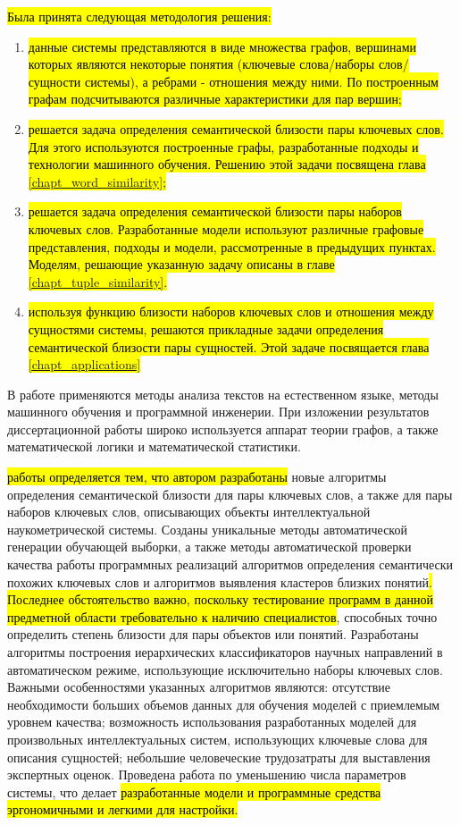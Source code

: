 \hl{Была принята следующая методология решения:}
\begin{enumerate}
    \item \hl{данные системы представляются в виде множества графов, вершинами которых являются некоторые понятия (ключевые слова/наборы слов/сущности системы), а ребрами - отношения между ними. По построенным графам подсчитываются различные характеристики для пар вершин;}
    \item \hl{решается задача определения семантической близости пары ключевых слов. Для этого используются построенные графы, разработанные подходы и технологии машинного обучения. Решению этой задачи посвящена глава {\ref{chapt_word_similarity}};}
    \item \hl{решается задача определения семантической близости пары наборов ключевых слов. Разработанные модели используют различные графовые представления, подходы и модели, рассмотренные в предыдущих пунктах. Моделям, решающие указанную задачу описаны в главе {\ref{chapt_tuple_similarity}}.}
    \item \hl{используя функцию близости наборов ключевых слов и отношения между сущностями системы, решаются прикладные задачи определения семантической близости пары сущностей. Этой задаче посвящается глава {\ref{chapt_applications}}}
\end{enumerate}
В работе применяются методы анализа текстов на естественном языке, методы машинного обучения и программной инженерии. При изложении результатов диссертационной работы широко используется аппарат теории графов, а также математической логики и математической статистики.

{\novelty}
\hl{работы определяется тем, что автором разработаны} новые алгоритмы определения семантической близости для пары ключевых слов, а также для пары наборов ключевых слов, описывающих объекты интеллектуальной наукометрической системы. Созданы уникальные методы автоматической генерации обучающей выборки, а также методы автоматической проверки качества работы программных реализаций алгоритмов определения семантически похожих ключевых слов и алгоритмов выявления кластеров близких понятий\hl{. Последнее обстоятельство важно, поскольку тестирование программ в данной предметной области требовательно к наличию специалистов}, способных точно определить степень близости для пары объектов или понятий. Разработаны алгоритмы построения иерархических классификаторов научных направлений в автоматическом режиме, использующие исключительно наборы ключевых слов. Важными особенностями  указанных алгоритмов являются: отсутствие необходимости больших объемов данных для обучения моделей с приемлемым уровнем качества; возможность использования разработанных моделей для произвольных интеллектуальных систем, использующих ключевые слова для описания сущностей; небольшие человеческие трудозатраты для выставления экспертных оценок. Проведена работа по уменьшению числа параметров системы, что делает \hl{разработанные модели и программные средства эргономичными и легкими для настройки.}

